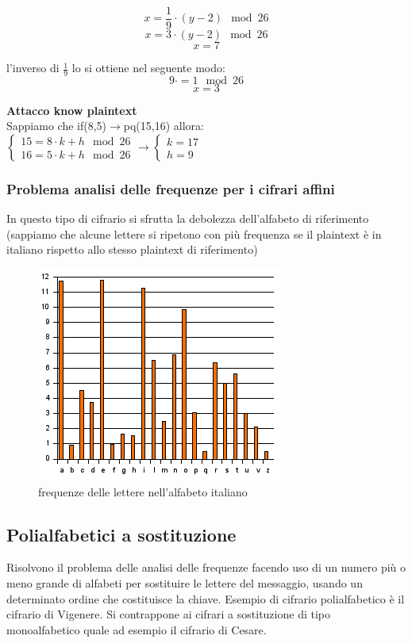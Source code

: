 \documentclass[10pt,a4paper]{article}
\begin{document}
$$x=\frac{1}{9}\cdot(y-2)\mod26$$
$$x=3\cdot(y-2)\mod26$$
$$x=7$$

l'inverso di $\frac{1}{9}$ lo si ottiene nel seguente modo:
$$9\cdot=1\mod26$$
$$x=3$$

\textbf{Attacco know plaintext} \\
Sappiamo che if(8,5)$\rightarrow$pq(15,16) allora:\\
$
\begin{cases}
15=8\cdot k+h \mod 26 \\
16 = 5\cdot k+h \mod26
\end{cases}
\rightarrow
\begin{cases}
k=17\\
h=9
\end{cases}
$
\newpage
\subsubsection{Problema analisi delle frequenze per i cifrari affini}
In questo tipo di cifrario si sfrutta la debolezza dell'alfabeto di riferimento (sappiamo che alcune lettere si ripetono con più frequenza se il plaintext è in italiano rispetto allo stesso plaintext di riferimento)
\begin{figure}[htbp]
\includegraphics[scale=0.8]{immagini/Frequenze-alf_it.png}
\caption{frequenze delle lettere nell'alfabeto italiano}
\end{figure}

\subsection{Polialfabetici a sostituzione}
Risolvono il problema delle analisi delle frequenze facendo uso di un numero più o meno grande di alfabeti per sostituire le lettere del messaggio, usando un determinato ordine che costituisce la chiave. Esempio di cifrario polialfabetico è il cifrario di Vigenere. Si contrappone ai cifrari a sostituzione di tipo monoalfabetico quale ad esempio il cifrario di Cesare.
\end{document}
